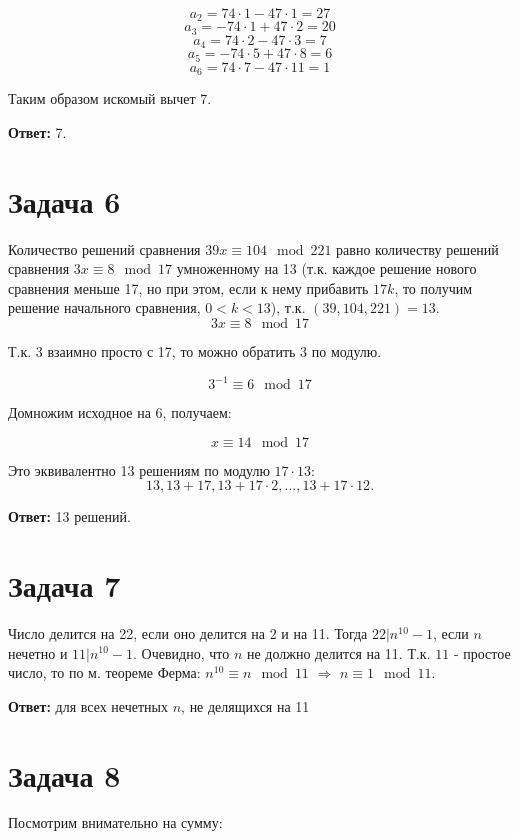 \documentclass{article}
\begin{document}
	$$a_2 = 74 \cdot 1 - 47\cdot1 = 27$$
	$$a_3 = -74 \cdot 1 + 47\cdot2 = 20$$
	$$a_4 = 74 \cdot 2 - 47\cdot3 = 7$$
	$$a_5 = -74 \cdot 5 + 47\cdot 8 = 6$$
	$$a_6 = 74 \cdot 7 - 47\cdot 11 = 1$$
	
	Таким образом искомый вычет $7$.
	
	\textbf{Ответ:} 7.
	
	\section{Задача 6}
	
	Количество решений сравнения $39x \equiv 104 \mod 221$ равно количеству решений сравнения $3x \equiv 8 \mod 17$ умноженному на 13 (т.к. каждое решение нового сравнения меньше 17, но при этом, если к нему прибавить $17k$, то получим решение начального сравнения, $0< k <13$), т.к. $(39, 104, 221) = 13$.
	\\
	$$3x \equiv 8 \mod 17$$
	
	Т.к. 3 взаимно просто с 17, то можно обратить 3 по модулю.
	
	$$3^{-1} \equiv 6 \mod 17$$
	
	Домножим исходное на 6, получаем:
	
	$$ x \equiv 14 \mod 17$$
	
	Это эквивалентно 13 решениям по модулю $17 \cdot 13$: $$13, 13 + 17, 13 + 17\cdot 2, ..., 13 + 17\cdot 12.$$
	
	\textbf{Ответ:} 13 решений. 
                             
	\section{Задача 7}                                                                                                                                                   
	
	Число делится на 22, если оно делится на 2 и на 11. Тогда $22 | n^{10} - 1$, если $n$ нечетно и $11|n^{10} - 1$. Очевидно, что $n$ не должно делится на 11. Т.к. $11$ - простое число, то по м. теореме Ферма: $n^{10} \equiv n \mod 11$ $\Rightarrow$ $n \equiv 1 \mod 11$.

	
	\textbf{Ответ:} для всех нечетных $n$, не делящихся на 11
	
	\section{Задача 8}
	
	Посмотрим внимательно на сумму:
	
\end{document}
